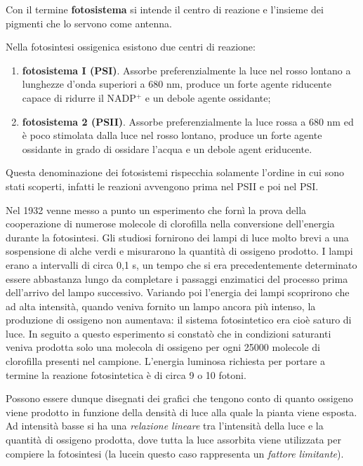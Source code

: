 \documentclass[]{article}
\begin{document}
Con il termine \textbf{fotosistema} si intende il centro di reazione e
l'insieme dei pigmenti che lo servono come antenna.

Nella fotosintesi ossigenica esistono due centri di reazione:

\begin{enumerate}
\def\labelenumi{\arabic{enumi}.}
\itemsep1pt\parskip0pt
\item
  \textbf{fotosistema I (PSI)}. Assorbe preferenzialmente la luce nel
  rosso lontano a lunghezze d'onda superiori a 680 nm, produce un forte
  agente riducente capace di ridurre il NADP$^+$ e un debole agente
  ossidante;
\item
  \textbf{fotosistema 2 (PSII)}. Assorbe preferenzialmente la luce rossa
  a 680 nm ed è poco stimolata dalla luce nel rosso lontano, produce un
  forte agente ossidante in grado di ossidare l'acqua e un debole agent
  eriducente.
\end{enumerate}

Questa denominazione dei fotosistemi rispecchia solamente l'ordine in
cui sono stati scoperti, infatti le reazioni avvengono prima nel PSII e
poi nel PSI.

Nel 1932 venne messo a punto un esperimento che fornì la prova della
cooperazione di numerose molecole di clorofilla nella conversione
dell'energia durante la fotosintesi. Gli studiosi fornirono dei lampi di
luce molto brevi a una sospensione di alche verdi e misurarono la
quantità di ossigeno prodotto. I lampi erano a intervalli di circa 0,1
s, un tempo che si era precedentemente determinato essere abbastanza
lungo da completare i passaggi enzimatici del processo prima dell'arrivo
del lampo successivo. Variando poi l'energia dei lampi scoprirono che ad
alta intensità, quando veniva fornito un lampo ancora più intenso, la
produzione di ossigeno non aumentava: il sistema fotosintetico era cioè
saturo di luce. In seguito a questo esperimento si constatò che in
condizioni saturanti veniva prodotta solo una molecola di ossigeno per
ogni 25000 molecole di clorofilla presenti nel campione. L'energia
luminosa richiesta per portare a termine la reazione fotosintetica è di
circa 9 o 10 fotoni.

Possono essere dunque disegnati dei grafici che tengono conto di quanto
ossigeno viene prodotto in funzione della densità di luce alla quale la
pianta viene esposta. Ad intensità basse si ha una \emph{relazione
lineare} tra l'intensità della luce e la quantità di ossigeno prodotta,
dove tutta la luce assorbita viene utilizzata per compiere la
fotosintesi (la lucein questo caso rappresenta un \emph{fattore
limitante}).
\end{document}
